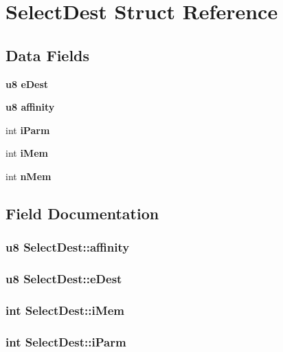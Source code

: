 \section{Select\-Dest Struct Reference}
\label{structSelectDest}
\subsection*{Data Fields}
\begin{CompactItemize}
\item 
\bf{u8} \bf{e\-Dest}
\item 
\bf{u8} \bf{affinity}
\item 
int \bf{i\-Parm}
\item 
int \bf{i\-Mem}
\item 
int \bf{n\-Mem}
\end{CompactItemize}


\subsection{Field Documentation}
\subsubsection{\setlength{\rightskip}{0pt plus 5cm}\bf{u8} \bf{Select\-Dest::affinity}}\label{structSelectDest_5614be5757e23e805a55472fc024d3c8}


\subsubsection{\setlength{\rightskip}{0pt plus 5cm}\bf{u8} \bf{Select\-Dest::e\-Dest}}\label{structSelectDest_638629d745ea04b408ec8b81bfb70c3a}


\subsubsection{\setlength{\rightskip}{0pt plus 5cm}int \bf{Select\-Dest::i\-Mem}}\label{structSelectDest_b98c64ec935017e8bc48571b3f32d192}


\subsubsection{\setlength{\rightskip}{0pt plus 5cm}int \bf{Select\-Dest::i\-Parm}}\label{structSelectDest_497c268060633baf5d146462dbfbe820}


